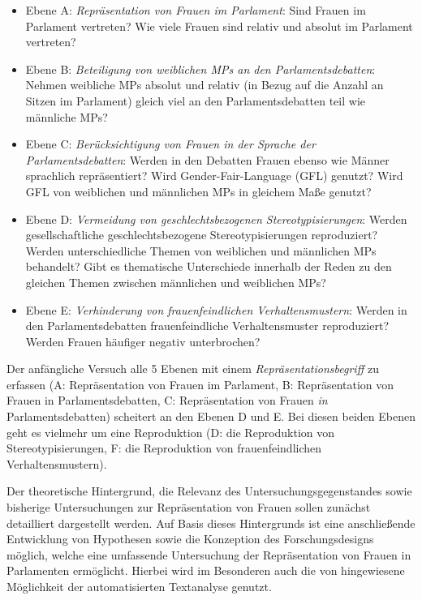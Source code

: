 \documentclass[12pt, 
    twoside=false, 
    bibliography=totoc, 
    numbers=endperiod, 
    headings=normal, 
    toc=chapterentrydotfill
    ]{scrbook}
\begin{document}
\begin{itemize}
    \item Ebene A: \emph{Repräsentation von Frauen im Parlament}: Sind Frauen im Parlament vertreten? Wie viele Frauen sind relativ und absolut im Parlament vertreten? 
    \item Ebene B: \emph{Beteiligung von weiblichen MPs an den Parlamentsdebatten}: Nehmen weibliche MPs absolut und relativ (in Bezug auf die Anzahl an Sitzen im Parlament) gleich viel an den Parlamentsdebatten teil wie männliche MPs? 
    \item Ebene C: \emph{Berücksichtigung von Frauen in der Sprache der Parlamentsdebatten}: Werden in den Debatten Frauen ebenso wie Männer sprachlich repräsentiert? Wird Gender-Fair-Language (GFL) genutzt? Wird GFL von weiblichen und männlichen MPs in gleichem Maße genutzt? 
    \item Ebene D: \emph{Vermeidung von geschlechtsbezogenen Stereotypisierungen}: Werden gesellschaftliche geschlechtsbezogene Stereotypisierungen reproduziert? Werden unterschiedliche Themen von weiblichen und männlichen MPs behandelt? Gibt es thematische Unterschiede innerhalb der Reden zu den gleichen Themen zwischen männlichen und weiblichen MPs? 
    \item Ebene E: \emph{Verhinderung von frauenfeindlichen Verhaltensmustern}: Werden in den Parlamentsdebatten frauenfeindliche Verhaltensmuster reproduziert? Werden Frauen häufiger negativ unterbrochen? 
    \end{itemize}

Der anfängliche Versuch alle 5 Ebenen mit einem \emph{Repräsentationsbegriff} zu erfassen (A: Repräsentation von Frauen im Parlament, B: Repräsentation von Frauen in Parlamentsdebatten, C: Repräsentation von Frauen \emph{in} Parlamentsdebatten) scheitert an den Ebenen D und E. Bei diesen beiden Ebenen geht es vielmehr um eine Reproduktion (D: die Reproduktion von Stereotypisierungen, F: die Reproduktion von frauenfeindlichen Verhaltensmustern). 

Der theoretische Hintergrund, die Relevanz des Untersuchungsgegenstandes sowie bisherige Untersuchungen zur Repräsentation von Frauen sollen zunächst detailliert dargestellt werden. Auf Basis dieses Hintergrunds ist eine anschließende Entwicklung von Hypothesen sowie die Konzeption des Forschungsdesigns möglich, welche eine umfassende Untersuchung der Repräsentation von Frauen in Parlamenten ermöglicht. Hierbei wird im Besonderen auch die von \textcite[18]{back_2018} hingewiesene Möglichkeit der automatisierten Textanalyse genutzt.
\end{document}
